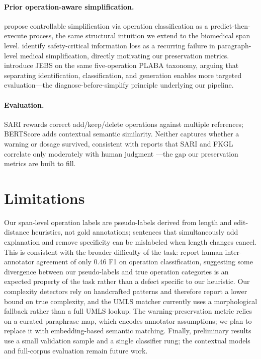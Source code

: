 \documentclass[11pt]{article}
\begin{document}
\paragraph{Prior operation-aware simplification.}
\citet{cripwell2022operation} propose controllable simplification via
operation classification as a predict-then-execute process, the same
structural intuition we extend to the biomedical span level.
\citet{devaraj2021medical} identify safety-critical information loss as a
recurring failure in paragraph-level medical simplification, directly
motivating our preservation metrics. \citet{xia2025jebs} introduce JEBS
on the same five-operation PLABA taxonomy, arguing that separating
identification, classification, and generation enables more targeted
evaluation---the diagnose-before-simplify principle underlying our
pipeline.

\paragraph{Evaluation.}
SARI \citep{xu2016sari} rewards correct add/keep/delete operations against
multiple references; BERTScore \citep{zhang2020bertscore} adds contextual
semantic similarity. Neither captures whether a warning or dosage
survived, consistent with reports that SARI and FKGL correlate only
moderately with human judgment \citep{alvamanchego2021unsuitability}---the
gap our preservation metrics are built to fill.

\section*{Limitations}

Our span-level operation labels are pseudo-labels derived from length and
edit-distance heuristics, not gold annotations; sentences that
simultaneously add explanation and remove specificity can be mislabeled
when length changes cancel. This is consistent with the broader
difficulty of the task: \citet{ondov2025lessons} report human
inter-annotator agreement of only 0.46 F1 on operation classification,
suggesting some divergence between our pseudo-labels and true operation
categories is an expected property of the task rather than a defect
specific to our heuristic. Our complexity detectors rely on handcrafted
patterns and therefore report a lower bound on true complexity, and the
UMLS matcher currently uses a morphological fallback rather than a full
UMLS lookup. The warning-preservation metric relies on a curated
paraphrase map, which encodes annotator assumptions; we plan to replace
it with embedding-based semantic matching. Finally, preliminary results
use a small validation sample and a single classifier rung; the
contextual models and full-corpus evaluation remain future work.


\end{document}

